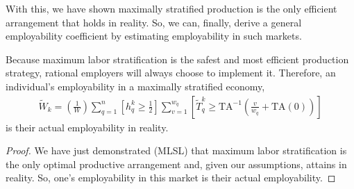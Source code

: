 \documentclass[hidelinks, nonatbib]{elsarticle}
\begin{document}
With this, we have shown maximally stratified production is the only efficient arrangement that holds in reality. So, we can, finally, derive a general employability coefficient by estimating employability in such markets.
\begin{get_theorem}[GET]
    Because maximum labor stratification is the safest and most efficient production strategy, rational employers will always choose to implement it. Therefore, an individual's employability in a maximally stratified economy,
    \begin{gather}
        \tilde{W}_k 
        =
        \left(
            \frac{1}{W}
        \right)
        \sum_{q=1}^{n}
        \left[
            h_{q}^{k}
            \geq
            \frac{1}{2}
        \right]
        \sum_{v=1}^{w_q}
        \left[
            \tilde{T}_{q}^{k}
            \geq
            \text{TA}^{-1}
            \left(
                \frac{v}{w_q}
                +
                \text{TA}(0)
            \right)
        \right]
    \end{gather}
    is their actual employability in reality.
    \begin{proof}
        We have just demonstrated (MLSL) that maximum labor stratification is the only optimal productive arrangement and, given our assumptions, attains in reality. So, one's employability in this market is their actual employability.


\end{proof}
\end{get_theorem}
\end{document}
